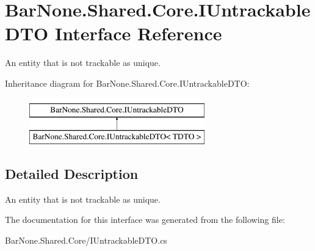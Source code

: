 \hypertarget{interface_bar_none_1_1_shared_1_1_core_1_1_i_untrackable_d_t_o}{}\section{Bar\+None.\+Shared.\+Core.\+I\+Untrackable\+D\+TO Interface Reference}
\label{interface_bar_none_1_1_shared_1_1_core_1_1_i_untrackable_d_t_o}


An entity that is not trackable as unique.  


Inheritance diagram for Bar\+None.\+Shared.\+Core.\+I\+Untrackable\+D\+TO\+:\begin{figure}[H]
\begin{center}
\leavevmode
\includegraphics[height=2.000000cm]{interface_bar_none_1_1_shared_1_1_core_1_1_i_untrackable_d_t_o}
\end{center}
\end{figure}


\subsection{Detailed Description}
An entity that is not trackable as unique. 



The documentation for this interface was generated from the following file\+:\begin{DoxyCompactItemize}
\item 
Bar\+None.\+Shared.\+Core/I\+Untrackable\+D\+T\+O.\+cs\end{DoxyCompactItemize}
